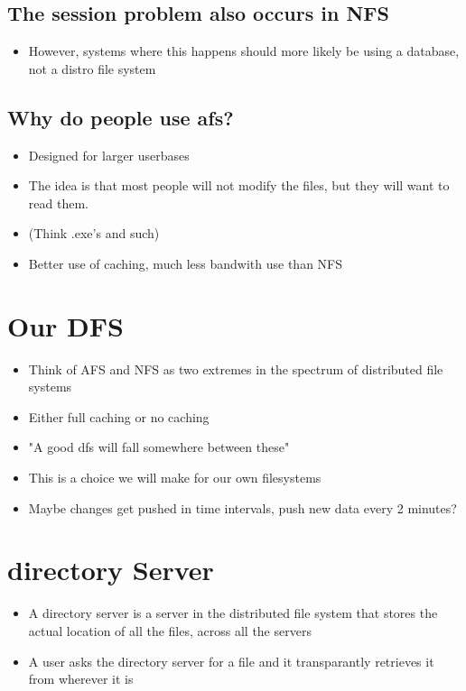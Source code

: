\documentclass[11pt]{article}
\begin{document}
\subsection{The session problem also occurs in NFS}
\label{sec-4-3}
\begin{itemize}
\item However, systems where this happens should more likely be using a database, not a distro file system
\end{itemize}

\subsection{Why do people use afs?}
\label{sec-4-4}
\begin{itemize}
\item Designed for larger userbases
\item The idea is that most people will not modify the files, but they will want to read them.
\item (Think .exe's and such)
\item Better use of caching, much less bandwith use than NFS
\end{itemize}

\section{Our DFS}
\label{sec-5}
\begin{itemize}
\item Think of AFS and NFS as two extremes in the spectrum of distributed file systems
\item Either full caching or no caching
\item "A good dfs will fall somewhere between these"
\item This is a choice we will make for our own filesystems
\item Maybe changes get pushed in time intervals, push new data every 2 minutes?
\end{itemize}

\section{directory Server}
\label{sec-6}
\begin{itemize}
\item A directory server is a server in the distributed file system that stores the actual location of all the files, across all the servers
\item A user asks the directory server for a file and it transparantly retrieves it from wherever it is
\end{itemize}
\end{document}
